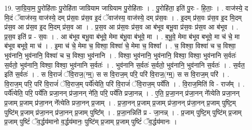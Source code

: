 \documentclass[17pt]{extarticle}
\begin{document}
19. जा॒ग्रि॒या॒म॒ पु॒रोहि॑ताः पु॒रोहि॑ता जाग्रियाम जाग्रियाम पु॒रोहि॑ताः । . पु॒रोहि॑ता॒ इति॑ पु॒रः - हि॒ताः॒ । . वाज॑स्ये॒ द मि॒दं ॅवाज॑स्य॒ वाज॑स्ये॒ दम् प्र॑स॒वः प्र॑स॒व इ॒दं ॅवाज॑स्य॒ वाज॑स्ये॒ दम् प्र॑स॒वः । . इ॒दम् प्र॑स॒वः प्र॑स॒व इ॒द मि॒दम् प्र॑स॒व आ प्र॑स॒व इ॒द मि॒दम् प्र॑स॒व आ । . प्र॒स॒व आ प्र॑स॒वः प्र॑स॒व आ ब॑भूव बभू॒वा प्र॑स॒वः प्र॑स॒व आ ब॑भूव । . प्र॒स॒व इति॑ प्र - स॒वः । . आ ब॑भूव बभू॒वा ब॑भूवे॒ मेमा ब॑भू॒वा ब॑भूवे॒ मा । . ब॒भू॒वे॒ मेमा ब॑भूव बभूवे॒ मा च॑ चे॒ मा ब॑भूव बभूवे॒ मा च॑ । . इ॒मा च॑ चे॒ मेमा च॒ विश्वा॒ विश्वा॑ चे॒ मेमा च॒ विश्वा᳚ । . च॒ विश्वा॒ विश्वा॑ च च॒ विश्वा॒ भुव॑नानि॒ भुव॑नानि॒ विश्वा॑ च च॒ विश्वा॒ भुव॑नानि । . विश्वा॒ भुव॑नानि॒ भुव॑नानि॒ विश्वा॒ विश्वा॒ भुव॑नानि स॒र्वतः॑ स॒र्वतो॒ भुव॑नानि॒ विश्वा॒ विश्वा॒ भुव॑नानि स॒र्वतः॑ । . भुव॑नानि स॒र्वतः॑ स॒र्वतो॒ भुव॑नानि॒ भुव॑नानि स॒र्वतः॑ । . स॒र्वत॒ इति॑ स॒र्वतः॑ । . स वि॒राजं॑ ॅवि॒राज॒(ग्म्॒) स स वि॒राज॒म् परि॒ परि॑ वि॒राज॒(ग्म्॒) स स वि॒राज॒म् परि॑ । . वि॒राज॒म् परि॒ परि॑ वि॒राजं॑ ॅवि॒राज॒म् पर्ये᳚त्येति॒ परि॑ वि॒राजं॑ ॅवि॒राज॒म् पर्ये॑ति । . वि॒राज॒मिति॑ वि - राज᳚म् । . पर्ये᳚त्येति॒ परि॒ पर्ये॑ति प्रजा॒नन् प्र॑जा॒नन् ने॑ति॒ परि॒ पर्ये॑ति प्रजा॒नन्न् । . ए॒ति॒ प्र॒जा॒नन् प्र॑जा॒नन् ने᳚त्येति प्रजा॒नन् प्र॒जाम् प्र॒जाम् प्र॑जा॒नन् ने᳚त्येति प्रजा॒नन् प्र॒जाम् । . प्र॒जा॒नन् प्र॒जाम् प्र॒जाम् प्र॑जा॒नन् प्र॑जा॒नन् प्र॒जाम् पुष्टि॒म् पुष्टि॑म् प्र॒जाम् प्र॑जा॒नन् प्र॑जा॒नन् प्र॒जाम् पुष्टि᳚म् । . प्र॒जा॒नन्निति॑ प्र - जा॒नन्न् । . प्र॒जाम् पुष्टि॒म् पुष्टि॑म् प्र॒जाम् प्र॒जाम् पुष्टिं॑ ॅव॒र्द्धय॑मानो व॒र्द्धय॑मानः॒ पुष्टि॑म् प्र॒जाम् प्र॒जाम् पुष्टिं॑ ॅव॒र्द्धय॑मानः । \newline
\end{document}
